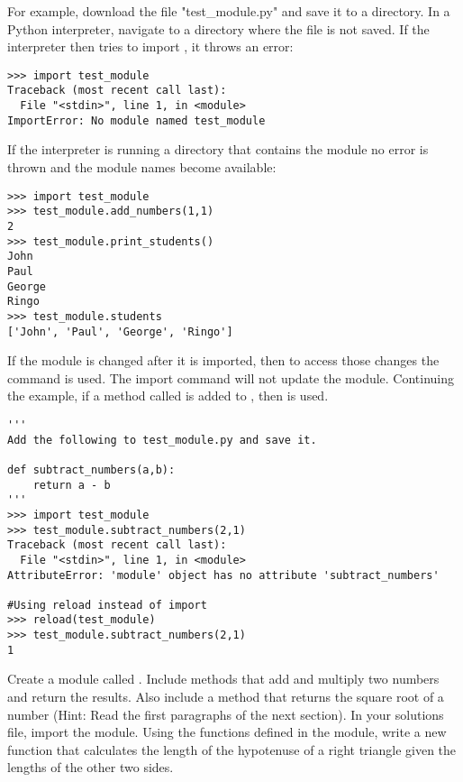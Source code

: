 For example, download the file "test\_module.py" and save it to a directory.
In a Python interpreter, navigate to a directory where the file is not saved.
If the interpreter then tries to import , it throws an error:

\begin{lstlisting}
>>> import test_module
Traceback (most recent call last):
  File "<stdin>", line 1, in <module>
ImportError: No module named test_module
\end{lstlisting}

If the interpreter is running a directory that contains the module no error is thrown and the module names become available:

\begin{lstlisting}
>>> import test_module
>>> test_module.add_numbers(1,1)
2
>>> test_module.print_students()
John
Paul
George
Ringo
>>> test_module.students
['John', 'Paul', 'George', 'Ringo']
\end{lstlisting}

If the module is changed after it is imported, then to access those changes the  command is used.
The import command will not update the module.
Continuing the example, if a method called  is added to , then  is used.

\begin{lstlisting}
'''
Add the following to test_module.py and save it.

def subtract_numbers(a,b):
	return a - b
'''
>>> import test_module
>>> test_module.subtract_numbers(2,1)
Traceback (most recent call last):
  File "<stdin>", line 1, in <module>
AttributeError: 'module' object has no attribute 'subtract_numbers'

#Using reload instead of import
>>> reload(test_module)
>>> test_module.subtract_numbers(2,1)
1
\end{lstlisting}

\begin{problem}

Create a module called .
Include methods that add and multiply two numbers and return the results.
Also include a method that returns the square root of a number (Hint:  Read the first paragraphs of the next section).
In your solutions file, import the  module.
Using the functions defined in the module, write a new function that calculates the length of the hypotenuse of a right triangle given the lengths of the other two sides.
\end{problem}

